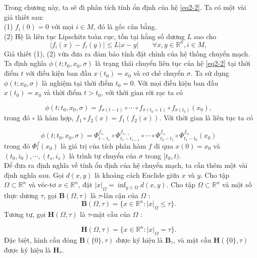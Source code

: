 \documentclass[14pt,a4paper,oneside]{report}		%
\theoremstyle{definition}
\begin{document}
Trong chương này, ta sẽ đi phân tích tính ổn định của hệ \ref{eq2-2}. Ta có một vài giả thiết sau:\\
(1) $f_i(0)=0$ với mọi $i\in M$, đó là gốc cân bằng.\\
(2) Hệ là liên tục Lipschitz toàn cục, tồn tại hằng số dương $L$ sao cho
\begin{equation} \label{eq2-3}
|f_i(x)-f_i(y)|\leq L|x-y|\qquad \forall x,y \in \mathbb{R}^n, i\in M,
\end{equation}
Giả thiết (1), (2) vừa đưa ra đảm bảo tính đặt chỉnh của hệ thống chuyển mạch.\\
Ta định nghĩa $\phi (t;t_0,x_0,\sigma)$ là trạng thái chuyển liên tục của hệ \ref{eq2-2} tại thời điểm $t$ với điều kiện ban đầu $x(t_0)=x_0$ và cơ chế chuyển $\sigma$. Ta sử dụng $\phi (t;x_0,\sigma)$ là nghiệm tại thời điểm $t_0 = 0$. Với mọi điều kiện ban đầu $x(t_0)=x_0$ và thời điểm $t>t_0$, với thời gian rời rạc ta có

\begin{equation} \label{eq2-4}
\phi (t;t_0,x_0,\sigma)=f_{\sigma (t-1)}\circ \cdots \circ f_{\sigma (t_0+1)}\circ f_{\sigma (t_0)}(x_0),
\end{equation}
trong đó $\circ$ là hàm hợp, $f_1 \circ f_2(x) = f_1(f_2(x))$. Với thời gian là liên tục ta có

\begin{equation} \label{eq2-5}
\phi (t;t_0,x_0,\sigma )=\Phi^{f_{i_s}}_{t-t_s}\circ\Phi^{f_{i_{s-1}}}_{t_s-t_{s-1}}\circ\cdots\circ\Phi^{f_{i_{1}}}_{t_2-t_{1}}\circ\Phi^{f_{i_{0}}}_{t_1-t_{0}}(x_0)
\end{equation}
trong đó $\Phi^f_t(x_0)$ là giá trị của tích phân hàm $f$ đi qua $x(0)=x_0$ và $(t_0,i_0),\cdots ,(t_s,i_s)$ là trình tự chuyển của $\sigma$ trong $[t_0,t)$.\\
Để đưa ra định nghĩa về tính ổn định của hệ chuyển mạch, ta cần thêm một vài định nghĩa sau. Gọi $d(x,y)$ là khoảng cách Euclide giữa $x$ và $y$. Cho tập $\Omega \subset\mathbb{R}^n$ và véc-tơ $x\in\mathbb{R}^n$, đặt $|x|_\Omega = \inf_{y\in\Omega}d(x,y)$. Cho tập $\Omega\subset\mathbb{R}^n$ và một số thực dương $\tau$, gọi $\mathbf{B}(\Omega , \tau)$ là $\tau$-lân cận của $\Omega$ :
$$\mathbf{B}(\Omega,\tau)=\{x\in\mathbb{R}^n:|x|_\Omega\leq\tau\}.$$
Tương tự, gọi $\mathbf{H}(\Omega,\tau)$ là $\tau$-mặt cầu của $\Omega$ :

$$\mathbf{H}(\Omega,\tau)=\{x\in\mathbb{R}^n:|x|_\Omega=\tau\}.$$
Đặc biệt, hình cầu đóng $\mathbf{B}(\{0\},\tau)$ được ký hiệu là $\mathbf{B}_\tau$, và mặt cầu $\mathbf{H}(\{0\},\tau)$ được ký hiệu là $\mathbf{H}_\tau$.
\end{document}
